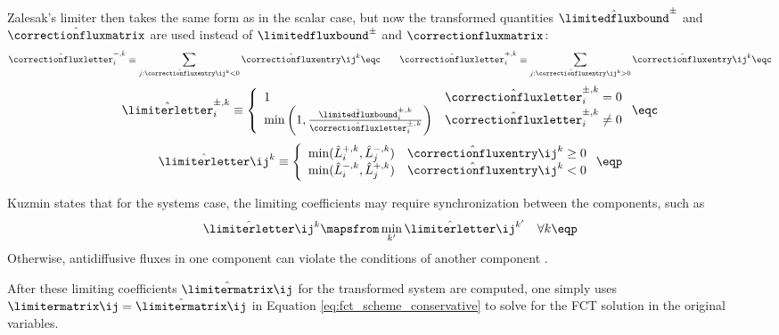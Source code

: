 Zalesak's limiter then takes the same form as in the scalar case, but
now the transformed quantities $\hat{\mathbf{\limitedfluxbound}}^\pm$
and $\hat{\correctionfluxmatrix}$ are used instead of
$\mathbf{\limitedfluxbound}^\pm$ and $\correctionfluxmatrix$:
\begin{equation}
  \hat{\correctionfluxletter}_i^{-,k} \equiv
    \sum\limits_{j:\hat{\correctionfluxentry}\ij^k<0}
    \hat{\correctionfluxentry}\ij^k \eqc \qquad
  \hat{\correctionfluxletter}_i^{+,k} \equiv
    \sum\limits_{j:\hat{\correctionfluxentry}\ij^k>0}
    \hat{\correctionfluxentry}\ij^k \eqc
\end{equation}
\begin{equation}
  \hat{\limiterletter}_i^{\pm,k} \equiv\left\{
    \begin{array}{l l}
      1 & \hat{\correctionfluxletter}_i^{\pm,k} = 0\\
      \min\left(1,\frac{\hat{\limitedfluxbound}_i^{\pm,k}}
        {\hat{\correctionfluxletter}_i^{\pm,k}}\right) &
      \hat{\correctionfluxletter}_i^{\pm,k} \ne 0
    \end{array}
  \right. \eqc
\end{equation}
\begin{equation}
  \hat{\limiterletter}\ij^k \equiv\left\{
    \begin{array}{l l}
      \min(\hat{L}_i^{+,k},\hat{L}_j^{-,k}) &
        \hat{\correctionfluxentry}\ij^k \geq 0\\
      \min(\hat{L}_i^{-,k},\hat{L}_j^{+,k}) &
        \hat{\correctionfluxentry}\ij^k < 0
    \end{array}
  \right. \eqp
\end{equation}

Kuzmin states that for the systems case, the limiting coefficients may require
synchronization between the components, such as
\begin{equation}
  \hat{\limiterletter}\ij^k \mapsfrom
    \min\limits_{k'}\hat{\limiterletter}\ij^{k'} \quad \forall k \eqp
\end{equation}
Otherwise, antidiffusive fluxes in one component can violate the
conditions of another component \cite{kuzmin_FCT}.

After these limiting coefficients $\hat{\limitermatrix}\ij$ for the transformed
system are computed, one simply uses $\limitermatrix\ij=\hat{\limitermatrix}\ij$
in Equation \eqref{eq:fct_scheme_conservative} to solve for the FCT solution
in the original variables.
